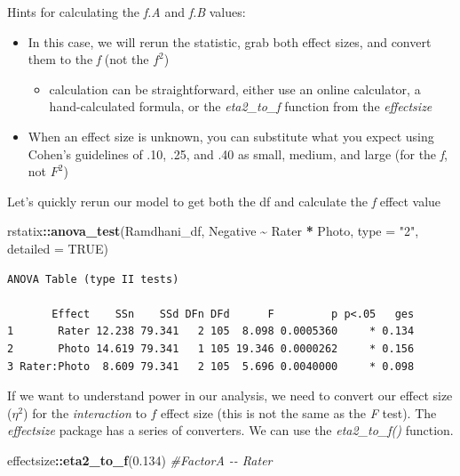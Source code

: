 \documentclass[
  11pt,
]{book}
\newenvironment{Shaded}{\begin{snugshade}}{\end{snugshade}}
\newcommand{\AttributeTok}[1]{\textcolor[rgb]{0.27,0.27,0.27}{#1}}
\newcommand{\CommentTok}[1]{\textcolor[rgb]{0.37,0.37,0.37}{\textit{#1}}}
\newcommand{\ConstantTok}[1]{\textcolor[rgb]{0.37,0.37,0.37}{#1}}
\newcommand{\FloatTok}[1]{\textcolor[rgb]{0.06,0.06,0.06}{#1}}
\newcommand{\FunctionTok}[1]{\textcolor[rgb]{0.27,0.27,0.27}{\textbf{#1}}}
\newcommand{\NormalTok}[1]{#1}
\newcommand{\SpecialCharTok}[1]{\textcolor[rgb]{0.43,0.43,0.43}{\textbf{#1}}}
\newcommand{\StringTok}[1]{\textcolor[rgb]{0.5,0.5,0.5}{#1}}
\providecommand{\tightlist}{%
  \setlength{\itemsep}{0pt}\setlength{\parskip}{0pt}}
\begin{document}
Hints for calculating the \emph{f.A} and \emph{f.B} values:

\begin{itemize}
\tightlist
\item
  In this case, we will rerun the statistic, grab both effect sizes, and convert them to the \emph{f} (not the \(f^2\))

  \begin{itemize}
  \tightlist
  \item
    calculation can be straightforward, either use an online calculator, a hand-calculated formula, or the \emph{eta2\_to\_f} function from the \emph{effectsize}
  \end{itemize}
\item
  When an effect size is unknown, you can substitute what you expect using Cohen's guidelines of .10, .25, and .40 as small, medium, and large (for the \emph{f}, not \(F^2\))
\end{itemize}

Let's quickly rerun our model to get both the df and calculate the \emph{f} effect value

\begin{Shaded}
\begin{Highlighting}[]
\NormalTok{rstatix}\SpecialCharTok{::}\FunctionTok{anova\_test}\NormalTok{(Ramdhani\_df, Negative }\SpecialCharTok{\textasciitilde{}}\NormalTok{ Rater }\SpecialCharTok{*}\NormalTok{ Photo, }\AttributeTok{type =} \StringTok{"2"}\NormalTok{,}
    \AttributeTok{detailed =} \ConstantTok{TRUE}\NormalTok{)}
\end{Highlighting}
\end{Shaded}

\begin{verbatim}
ANOVA Table (type II tests)

       Effect    SSn    SSd DFn DFd      F         p p<.05   ges
1       Rater 12.238 79.341   2 105  8.098 0.0005360     * 0.134
2       Photo 14.619 79.341   1 105 19.346 0.0000262     * 0.156
3 Rater:Photo  8.609 79.341   2 105  5.696 0.0040000     * 0.098
\end{verbatim}

If we want to understand power in our analysis, we need to convert our effect size (\(\eta^2\)) for the \emph{interaction} to \(f\) effect size (this is not the same as the \emph{F} test). The \emph{effectsize} package has a series of converters. We can use the \emph{eta2\_to\_f()} function.

\begin{Shaded}
\begin{Highlighting}[]
\NormalTok{effectsize}\SpecialCharTok{::}\FunctionTok{eta2\_to\_f}\NormalTok{(}\FloatTok{0.134}\NormalTok{)  }\CommentTok{\#FactorA {-}{-} Rater}
\end{Highlighting}
\end{Shaded}
\end{document}

